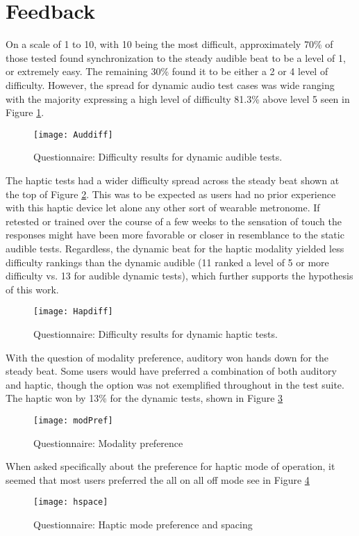\section{Feedback}
On a scale of 1 to 10, with 10 being the most difficult, approximately 70\% of those tested found synchronization to the steady audible beat to be a level of 1, or extremely easy. The remaining 30\% found it to be either a 2 or 4 level of difficulty. However, the spread for dynamic audio test cases was wide ranging with the majority expressing a high level of difficulty 81.3\% above level 5 seen in Figure \ref{fig:Auddiff}.

\begin{figure}[H]
    \centering
    \texttt{[image: Auddiff]}
    \caption{Questionnaire: Difficulty results for dynamic audible tests.}
    \label{fig:Auddiff}
\end{figure}

The haptic tests had a wider difficulty spread across the steady beat shown at the top of Figure \ref{fig:Hapdiff}. This was to be expected as users had no prior experience with this haptic device let alone any other sort of wearable metronome. If retested or trained over the course of a few weeks to the sensation of touch the responses might have been more favorable or closer in resemblance to the static audible tests. Regardless, the dynamic beat for the haptic modality yielded less difficulty rankings than the dynamic audible (11 ranked a level of 5 or more difficulty vs. 13 for audible dynamic tests), which further supports the hypothesis of this work.
\begin{figure}[H]
    \centering
    \texttt{[image: Hapdiff]}
    \caption{Questionnaire: Difficulty results for dynamic haptic tests.}
    \label{fig:Hapdiff}
\end{figure}

With the question of modality preference, auditory won hands down for the steady beat. Some users would have preferred a combination of both auditory and haptic, though the option was not exemplified throughout in the test suite. The haptic won by 13\% for the dynamic tests, shown in Figure \ref{fig:modPref}
\begin{figure}[H]
    \centering
    \texttt{[image: modPref]}
    \caption{Questionnaire: Modality preference}
    \label{fig:modPref}
\end{figure}

When asked specifically about the preference for haptic mode of operation, it seemed that most users preferred the all on all off mode see in Figure \ref{fig:hspace}
\begin{figure}[H]
    \centering
    \texttt{[image: hspace]}
    \caption{Questionnaire: Haptic mode preference and spacing}
    \label{fig:hspace}
\end{figure}

